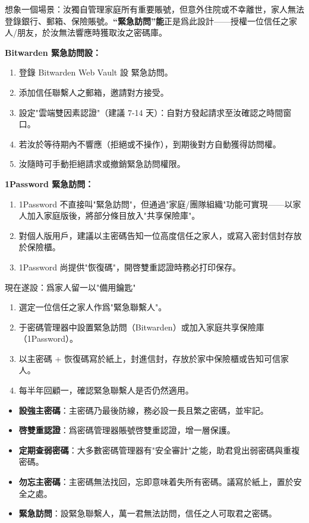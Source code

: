 
想象一個場景：汝獨自管理家庭所有重要賬號，但意外住院或不幸離世，家人無法登錄銀行、郵箱、保險賬號。\textbf{“緊急訪問”能}正是爲此設計——授權一位信任之家人/朋友，於汝無法響應時獲取汝之密碼庫。

\textbf{Bitwarden 緊急訪問設：}

\begin{enumerate}
  \item 登錄 Bitwarden Web Vault 設 緊急訪問。
  \item 添加信任聯繫人之郵箱，邀請對方接受。
  \item 設定"雲端雙因素認證"（建議 7-14 天）：自對方發起請求至汝確認之時間窗口。
  \item 若汝於等待期內不響應（拒絕或不操作），到期後對方自動獲得訪問權。
  \item 汝隨時可手動拒絕請求或撤銷緊急訪問權限。
\end{enumerate}

\textbf{1Password 緊急訪問：}

\begin{enumerate}
  \item 1Password 不直接叫"緊急訪問"，但通過"家庭/團隊組織"功能可實現——以家人加入家庭版後，將部分條目放入"共享保險庫"。
  \item 對個人版用戶，建議以主密碼告知一位高度信任之家人，或寫入密封信封存放於保險櫃。
  \item 1Password 尚提供"恢復碼"，開啓雙重認證時務必打印保存。
\end{enumerate}

\begin{tcbpractice}{現在遂設：爲家人留一以"備用鑰匙"}
\begin{enumerate}
  \item 選定一位信任之家人作爲"緊急聯繫人"。
  \item 于密碼管理器中設置緊急訪問（Bitwarden）或加入家庭共享保險庫（1Password）。
  \item 以主密碼 + 恢復碼寫於紙上，封進信封，存放於家中保險櫃或告知可信家人。
  \item 每半年回顧一，確認緊急聯繫人是否仍然適用。
\end{enumerate}

\end{tcbpractice}


\begin{itemize}
  \item \textbf{設強主密碼}：主密碼乃最後防線，務必設一長且繁之密碼，並牢記。
  \item \textbf{啓雙重認證}：爲密碼管理器賬號啓雙重認證，增一層保護。
  \item \textbf{定期查弱密碼}：大多數密碼管理器有"安全審計"之能，助君覓出弱密碼與重複密碼。
  \item \textbf{勿忘主密碼}：主密碼無法找回，忘即意味着失所有密碼。議寫於紙上，置於安全之處。
  \item \textbf{緊急訪問}：設緊急聯繫人，萬一君無法訪問，信任之人可取君之密碼。
\end{itemize}

